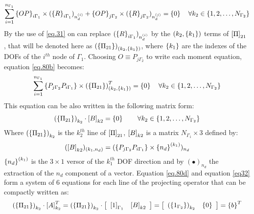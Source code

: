 \begin{eqnarray}
\label{eq.80b}
\begin{aligned}
\sum_{i=1}^{n_{\Gamma_1}}\left\lbrace{OP}\right \rbrace_{i\Gamma_1}\times (\left\lbrace{R}\right \rbrace_{i\Gamma_1})_{n_d^{(i)}}+\left\lbrace{OP}\right \rbrace_{j\Gamma_2}\times (\left\lbrace{R}\right \rbrace_{j\Gamma_2})_{n_d^{(j)}}=\left\lbrace{0}\right \rbrace \quad \forall k_2\in \lbrace1,2,\dots,N_{\Gamma_2} \rbrace
\end{aligned}
\end{eqnarray}
By the use of \eqref{eq.31} on can replace $(\left\lbrace{R}\right \rbrace_{i\Gamma_1})_{n_d^{(i)}}$ by the $(k_2,\left\lbrace{k_1}\right \rbrace)$ terms of $\left[{\Pi}\right]_{21}$ , that will be denoted here as $\left(\left\lbrace{\Pi_{21}}\right \rbrace\right)_{(k_2,\left\lbrace{k_1}\right \rbrace)}$, where   $\left\lbrace{k_1}\right \rbrace$ are the indexes of the DOFs of the $i^{th}$ node of $\Gamma_1$. Choosing $O \equiv P_{j\Gamma_2} $ to write each moment equation, equation \eqref{eq.80b} becomes:
\begin{eqnarray}
\label{eq.80c}
\begin{aligned}
\sum_{i=1}^{n_{\Gamma_1}}\left\lbrace{P_{j\Gamma_2}P_{i\Gamma_1}}\right \rbrace\times \left(\left\lbrace{\Pi_{21}}\right \rbrace\right)_{(k_2,\left\lbrace{k_1}\right \rbrace)}^T=\left\lbrace{0}\right \rbrace \quad \forall k_2\in \lbrace1,2,\dots,N_{\Gamma_2} \rbrace
\end{aligned}
\end{eqnarray}
This equation can be also written in the following matrix form:
\begin{eqnarray}
\label{eq.80d}
\left(\left\lbrace{\Pi_{21}}\right \rbrace\right)_{k_2}\cdot\left[{B}\right]_{k2}=\left\lbrace{0}\right \rbrace \qquad \forall k_2\in \lbrace1,2,\dots,N_{\Gamma_2} \rbrace
\end{eqnarray}
Where $\left(\left\lbrace{\Pi_{21}}\right \rbrace\right)_{k_2}$ is the $k_2^{th}$ line of $\left[{\Pi}\right]_{21}$, $\left[{B}\right]_{k2}$ is a matrix $N_{\Gamma_1}\times3$ defined by:
\begin{eqnarray}
\label{eq.80e}
(\left[{B}\right]_{k2})_{(k_1,n_d)}=(\left\lbrace{P_{j\Gamma_2}P_{i\Gamma_1}}\right \rbrace\times\left\lbrace{n_d}\right \rbrace^{(k_1)})_{n_d}
\end{eqnarray}
 $\left\lbrace{n_d}\right \rbrace^{(k_1)}$ is the $3\times1$ versor of the $k_1^{th}$ DOF direction and by $(\bullet)_{n_d}$ the extraction of the  ${n_d}$ component of a vector. Equation \eqref{eq.80d} and equation \eqref{eq32} form a system of 6 equations for each line of the projecting operator that can be compactly written as:
 \begin{equation}
 \label{eq.80f}
 \left(\left\lbrace{\Pi_{21}}\right \rbrace\right)_{k_2}\cdot\left[{A}\right]_{k_2}^T=\left(\left\lbrace{\Pi_{21}}\right \rbrace\right)_{k_2}\cdot\left[
 \begin{array}{c c}
   \left[{1}\right]_{\Gamma_1}&
   \left[{B}\right]_{k2}
 \end{array}
 \right]=\left[\begin{array}{c c}
   \left(\left\lbrace{1_{\Gamma_2}}\right \rbrace\right)_{k_2}&
   \left\lbrace{0}\right \rbrace
 \end{array}
 \right]=\left\lbrace{b}\right \rbrace^T
 \end{equation}
